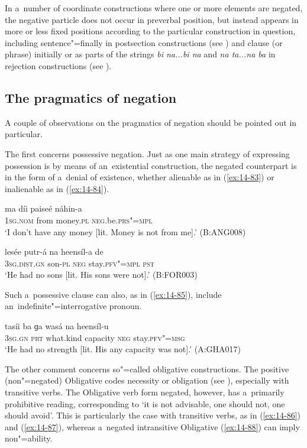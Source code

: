 In a~number of coordinate constructions where one or more elements are negated, the negative particle does not occur in preverbal position, but instead appears in more or less fixed positions according to the particular construction in question, including sentence"=finally in postsection constructions (see ) and clause (or phrase) initially or as parts of the strings \textit{bi na...bi na} and \textit{na ta...na ba} in rejection constructions (see ). 


\subsection{The pragmatics of negation}
\label{subsec:14-3-4}


A couple of observations on the pragmatics of negation should be pointed out in particular.


The first concerns possessive negation. Just as one main strategy of expressing possession is by means of an~existential construction, the negated counterpart is in the form of a~denial of existence, whether alienable as in (\ref{ex:14-83}) or inalienable as in (\ref{ex:14-84}).

\begin{exe}
\ex
\label{ex:14-83}
\gll ma díi paiseé náhin-a \\
\textsc{1sg.nom} from money.\textsc{pl} \textsc{neg}.be.\textsc{prs"=mpl}  \\
\glt `I don't have any money [lit. Money is not from me].' (B:ANG008)

\ex
\label{ex:14-84}
\gll lesée putr-á na heensíl-a de \\
\textsc{3sg.dist.gn} son-\textsc{pl} \textsc{neg} stay.\textsc{pfv"=mpl} \textsc{pst}  \\
\glt `He had no sons [lit. His sons were not].' (B:FOR003)
\end{exe}

Such a~possessive clause can also, as in (\ref{ex:14-85}), include an~indefinite"=interrogative pronoun.

\begin{exe}
\ex
\label{ex:14-85}
\gll tasíi ba ɡa wasá na heensíl-u \\
\textsc{3sg.gn} \textsc{prt} what.kind capacity \textsc{neg} stay.\textsc{pfv"=msg } \\
\glt `He had no strength [lit. His any capacity was not].' (A:GHA017)
\end{exe}

The other comment concerns so"=called obligative constructions. The positive (non"=negated) Obligative codes necessity or obligation (see ), especially with transitive verbs. The Obligative verb form negated, however, has a~primarily prohibitive reading, corresponding to `it is not advisable, one should not, one should avoid'. This is particularly the case with transitive verbs, as in (\ref{ex:14-86}) and (\ref{ex:14-87}), whereas a~negated intransitive Obligative (\ref{ex:14-88}) can imply non"=ability.

